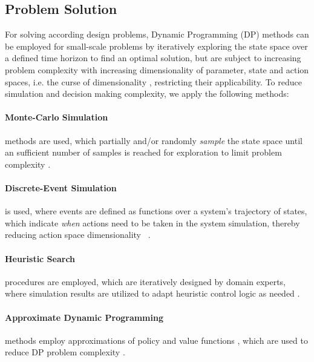 \documentclass[a4paper,twoside]{article}
\begin{document}
	\subsection{Problem Solution}
	\label{sec:problem-solution}

	For solving according design problems, Dynamic Programming (DP) \cite{bellman_dynamic_1957} methods can be employed for small-scale problems by iteratively exploring the state space over a defined time horizon to find an optimal solution, but are subject to increasing problem complexity with increasing dimensionality of parameter, state and action spaces, i.e. the curse of dimensionality \cite{bellman_dynamic_1957}, restricting their applicability.
	To reduce simulation and decision making complexity, we apply the following methods:

	\paragraph{Monte-Carlo Simulation} methods are used, which partially and/or randomly \textit{sample} the state space until an sufficient number of samples is reached for exploration to limit problem complexity \cite{ascher_hackenberg_2015}.

	\paragraph{Discrete-Event Simulation} is used, where events are defined as functions over a system's trajectory of states, which indicate \textit{when} actions need to be taken in the system simulation, thereby reducing action space dimensionality ~\cite{ascher2023discrete}.

	\paragraph{Heuristic Search} procedures are employed, which are iteratively designed by domain experts, where simulation results are utilized to adapt heuristic control logic as needed \cite{ascher_hackenberg_2015}.

	\paragraph{Approximate Dynamic Programming} methods employ approximations of policy and value functions \cite{powell_approximate_2007}, which are used to reduce DP problem complexity \cite{ascher_hackenberg_albayrak_2023}.
	
\end{document}
